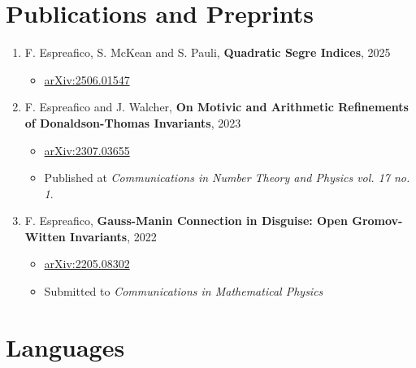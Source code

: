\documentclass[10pt,a4paper,roman]{moderncv}        %
\begin{document}
\section{Publications and Preprints}
\begin{enumerate}
    \item F. Espreafico, S. McKean and S. Pauli, \textbf{Quadratic Segre Indices}, 2025 
    \begin{itemize}
    \item \href{http://arxiv.org/abs/2506.01547}{arXiv:2506.01547}
    
    \end{itemize}
	\item F. Espreafico and J. Walcher, \textbf{On Motivic and Arithmetic Refinements of Donaldson-Thomas Invariants}, 2023
	\begin{itemize}
		\item \href{http://arxiv.org/abs/2307.03655}{arXiv:2307.03655}
        \item Published at \textit{Communications in Number Theory and Physics vol. 17 no. 1}.
	\end{itemize}
	\item F. Espreafico, \textbf{Gauss-Manin Connection in Disguise: Open Gromov-Witten Invariants}, 2022
	\begin{itemize}
		\item \href{http://arxiv.org/abs/2205.08302}{arXiv:2205.08302}
        \item Submitted to \textit{Communications in Mathematical Physics}
	\end{itemize}
\end{enumerate}

\section{Languages}
\end{document}
